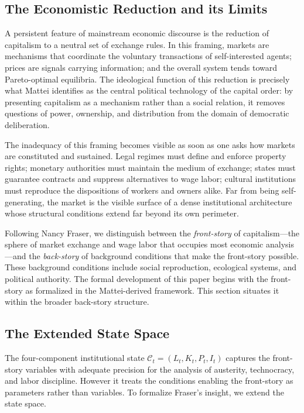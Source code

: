 \documentclass[12pt,a4paper]{article}
\theoremstyle{definition}
\theoremstyle{remark}
\begin{document}
\subsection{The Economistic Reduction and its Limits}

A persistent feature of mainstream economic discourse is the reduction of capitalism to a neutral set of exchange rules. In this framing, markets are mechanisms that coordinate the voluntary transactions of self-interested agents; prices are signals carrying information; and the overall system tends toward Pareto-optimal equilibria. The ideological function of this reduction is precisely what Mattei identifies as the central political technology of the capital order: by presenting capitalism as a mechanism rather than a social relation, it removes questions of power, ownership, and distribution from the domain of democratic deliberation.

The inadequacy of this framing becomes visible as soon as one asks how markets are constituted and sustained. Legal regimes must define and enforce property rights; monetary authorities must maintain the medium of exchange; states must guarantee contracts and suppress alternatives to wage labor; cultural institutions must reproduce the dispositions of workers and owners alike. Far from being self-generating, the market is the visible surface of a dense institutional architecture whose structural conditions extend far beyond its own perimeter.

Following Nancy Fraser, we distinguish between the \emph{front-story} of capitalism---the sphere of market exchange and wage labor that occupies most economic analysis---and the \emph{back-story} of background conditions that make the front-story possible. These background conditions include social reproduction, ecological systems, and political authority. The formal development of this paper begins with the front-story as formalized in the Mattei-derived framework. This section situates it within the broader back-story structure.

\subsection{The Extended State Space}

The four-component institutional state $\mathcal{C}_t = (L_t, K_t, P_t, I_t)$ captures the front-story variables with adequate precision for the analysis of austerity, technocracy, and labor discipline. However it treats the conditions enabling the front-story as parameters rather than variables. To formalize Fraser's insight, we extend the state space.
\end{document}

